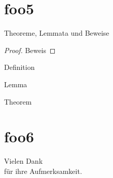 \documentclass{beamer}
\begin{document}
\section{foo5}
\begin{frame}{Theoreme, Lemmata und Beweise}
\begin{proof}
        Beweis
\end{proof}

\begin{definition}
        Definition
\end{definition}

\begin{lemma}[Hilfssatz]
        Lemma
\end{lemma}

\begin{theorem}[Lehrsatz]
        Theorem
\end{theorem}
\end{frame}


\section{foo6}
\begin{frame}
\vfill
\begin{center}\begin{Huge}Vielen Dank \\[10pt]
f\"ur ihre Aufmerksamkeit.\end{Huge}\vfill
\end{center}
\vfill
\end{frame}
\end{document}
